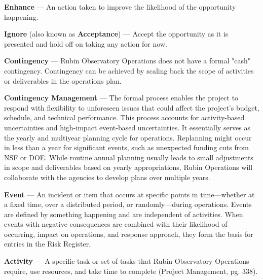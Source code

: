 \textbf{Enhance} ---
An action taken to improve the likelihood of the opportunity happening.

\textbf{Ignore} (also known as \textbf{Acceptance}) ---
Accept the opportunity as it is presented and hold off on taking any action for now.

\textbf{Contingency} ---
Rubin Observatory Operations does not have a formal "cash" contingency. Contingency can be achieved by scaling back the scope of activities or deliverables in the operations plan.

\textbf{Contingency Management} ---
The formal process enables the project to respond with flexibility to unforeseen issues that could affect the project’s budget, schedule, and technical performance. This process accounts for activity-based uncertainties and high-impact event-based uncertainties. It essentially serves as the yearly and multiyear planning cycle for operations. Replanning might occur in less than a year for significant events, such as unexpected funding cuts from NSF or DOE. While routine annual planning usually leads to small adjustments in scope and deliverables based on yearly appropriations, Rubin Operations will collaborate with the agencies to develop plans over multiple years.

\textbf{Event} ---
An incident or item that occurs at specific points in time—whether at a fixed time, over a distributed period, or randomly—during operations. Events are defined by something happening and are independent of activities. When events with negative consequences are combined with their likelihood of occurring, impact on operations, and response approach, they form the basis for entries in the Risk Register.

\textbf{Activity} ---
A specific task or set of tasks that Rubin Observatory Operations require, use resources, and take time to complete (Project Management, pg. 338).
